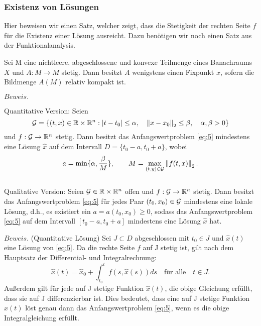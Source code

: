 \subsubsection{Existenz von Lösungen}
Hier beweisen wir einen Satz, welcher zeigt, dass die Stetigkeit der rechten Seite $f$ für die Existenz einer
Lösung ausreicht. Dazu benötigen wir noch einen Satz aus der Funktionalanalysis.
\begin{satz}
    Sei M eine nichtleere, abgeschlossene und konvexe Teilmenge eines Banachraums $X$ und $A:M \rightarrow M$ stetig.
    Dann besitzt $A$ wenigstens einen Fixpunkt $x$, sofern die Bildmenge $A(M)$ relativ kompakt ist.
\end{satz}
$Beweis.$ \cite[13,14]{sundermeierFixpunktsatzSchauder}
\begin{satz}
    Quantitative Version: Seien
    \[
        {\cal G}=\{(t,x) \in \mathbb{R} \times \mathbb{R}^{n}: |t-t_{0}| \leq \alpha, \quad
        \left\lVert x-x_{0} \right\rVert _{2} \leq\beta, \quad \alpha,\beta > 0 \}
    \]
    und $f:{\cal G} \rightarrow \mathbb{R}^{n}$ stetig. Dann besitzt das Anfangswertproblem \eqref{eq:5}
    mindestens eine Lösung $\hat{x}$ auf dem Intervall $D=\{t_{0}-a,t_{0}+a\}$, wobei
    \[
        a=\min\{\alpha, \frac{\beta}{M}\}, \qquad M= \max_{(t,y)\in {\cal G}}\left\lVert f(t,x)\right\rVert_{2}.
    \]\\
    Qualitative Version: Seien ${\cal G}\in \mathbb{R} \times \mathbb{R}^{n}$ offen und $f:{\cal G} \rightarrow \mathbb{R}^{n}$ stetig.
    Dann besitzt das Anfangswertproblem \eqref{eq:5} für jedes Paar $(t_{0},x_{0}) \in {\cal G}$ mindestens eine
    lokale Lösung, d.h., es existiert ein $a=a(t_{0},x_{0}) \geq 0$, sodass das Anfangswertproblem \eqref{eq:5} auf
    dem Intervall $[t_{0}-a,t_{0}+a]$ mindestens eine Lösung $\hat{x}$ hat.
\end{satz}
$Beweis.$ (Quantitative Lösung) Sei $J\subset D$ abgeschlossen mit $t_0 \in J$ und $\hat{x}(t)$ eine Lösung von \eqref{eq:5}.
Da die rechte Seite $f$ auf J stetig ist, gilt nach dem Hauptsatz der Differential- und Integralrechnung:
\[
    \hat{x}(t) = \hat{x}_0 + \int_{t_0}^{t} f(s, \hat{x}(s)) ds \quad \text{für alle} \quad t \in J.
\]
Außerdem gilt für jede auf J stetige Funktion $\hat{x}(t)$, die obige Gleichung erfüllt, dass sie auf J differenzierbar
ist. Dies bedeutet, dass eine auf J stetige Funktion $\hat{x}(t)$ löst genau dann das Anfangswertproblem \eqref{eq:5},
wenn es die obige Integralgleichung erfüllt.
